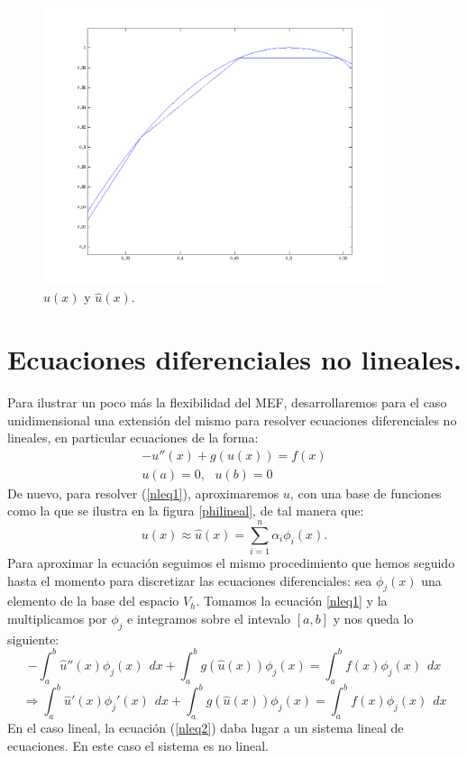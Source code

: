 \documentclass[12pt,spanish,oneside]{book}
\theoremstyle{plain}
\numberwithin{equation}{chapter}
\theoremstyle{definition}
\theoremstyle{remark}
\newcommand{\dx}{\hspace{5pt} dx}
\begin{document}
\begin{figure}[H]
\centering
\includegraphics[width=10cm]{img/acercamientosin10nod.png}
\caption{$u(x)$ y $\hat{u}(x)$.}
\label{fig:asin10nod}
\end{figure}

\section{Ecuaciones diferenciales no lineales.}
Para ilustrar un poco más la flexibilidad del MEF, desarrollaremos para el caso unidimensional una extensión del mismo para resolver ecuaciones diferenciales no lineales, en particular ecuaciones de la forma: 
\begin{eqnarray}
-u''(x)+g(u(x))=f(x) \\ \label{nleq1}
u(a)=0,\text{ } u(b)=0
\end{eqnarray}
De nuevo, para resolver (\ref{nleq1}), aproximaremos $u$, con una base de funciones como la que se ilustra en la figura \ref{philineal}, de tal manera que:
\[u(x)\approx\hat{u}(x)=\sum_{i=1}^n\alpha_i\phi_i(x).\]
Para aproximar la ecuación seguimos el mismo procedimiento que hemos seguido hasta el momento para discretizar las ecuaciones diferenciales: sea $\phi_j(x)$ una elemento de la base del espacio $V_h$. Tomamos la ecuación \ref{nleq1} y la multiplicamos por $\phi_j$ e integramos sobre el intevalo $[a,b]$ y nos queda lo siguiente: 
\[-\int_a^b \hat{u}''(x)\phi_j(x)\dx+\int_{a}^b g(\hat{u}(x)) \phi_j(x)=\int_a^bf(x)\phi_j(x)\dx\]
\begin{equation}
\Rightarrow\int_a^b \hat{u}'(x)\phi_j'(x)\dx+\int_{a}^b g(\hat{u}(x)) \phi_j(x)=\int_a^bf(x)\phi_j(x)\dx\label{nleq2}
\end{equation}
En el caso lineal, la ecuación (\ref{nleq2}) daba lugar a un sistema lineal de ecuaciones. En este caso el sistema es no lineal.
\end{document}
